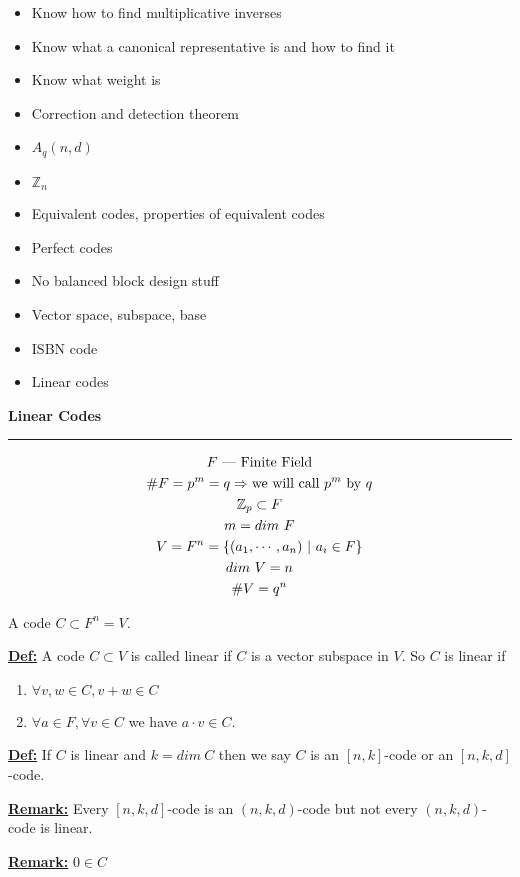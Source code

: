 \documentclass{article}
\newcommand{\header}[1]{
	\begin{Large}
	\noindent\textbf{#1}
	\vspace{2pt}
	\hrule
	\vspace{16pt}
	\end{Large}
	\normalsize
}
\newcommand{\eqs}[1]{
	\begin{gather*}
		#1
	\end{gather*}
}
\renewcommand{\b}[1]{\textbf{#1}}
\newcommand{\ul}[1]{\underline{#1}}
\newcommand{\dash}{\textnormal{ \textemdash}}
\newcommand{\newdef}[2]{\b{\ul{#1:}} #2}
\begin{document}
\begin{itemize}
	\item Know how to find multiplicative inverses
	\item Know what a canonical representative is and how to find it
	\item Know what weight is
	\item Correction and detection theorem
	\item $A_q(n, d)$
	\item $\mathbb{Z}_n$
	\item Equivalent codes, properties of equivalent codes
	\item Perfect codes
	\item No balanced block design stuff
	\item Vector space, subspace, base
	\item ISBN code
	\item Linear codes
\end{itemize}

\header{Linear Codes}
\eqs{
	F \dash \textnormal{ Finite Field} \\
	\#F = p^m = q \Rightarrow \textnormal{we will call $p^m$ by $q$} \\
	\mathbb{Z}_p \subset F \\
	m = dim\ F \\
	V = F^n = \{(a_1, \cdots, a_n)\ |\ a_i \in F\} \\
	dim\ V = n \\
	\#V = q^n
}
A code $C \subset F^n = V$.

\newdef{Def}{
	A code $C \subset V$ is called linear if $C$ is a vector subspace in
	$V$. So $C$ is linear if
	\begin{enumerate}
		\item $\forall v, w \in C, v+w \in C$
		\item $\forall a \in F, \forall v \in C$ we have
		      $a \cdot v \in C$.
	\end{enumerate}
}

\newdef{Def}{
	If $C$ is linear and $k = dim\ C$ then we say $C$ is an $[n, k]$-code
	or an $[n, k , d]$-code.
}

\newdef{Remark}{
	Every $[n, k, d]$-code is an $(n, k, d)$-code but not every
	$(n, k, d)$-code is linear.
}

\newdef{Remark}{$0 \in C$}
\end{document}
